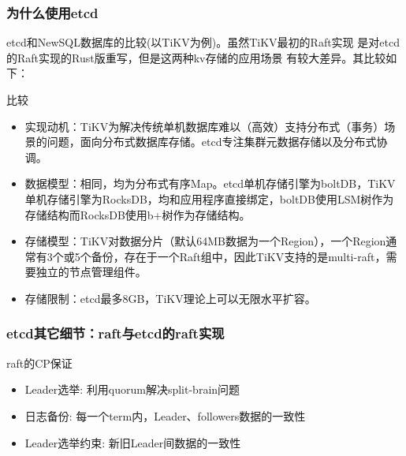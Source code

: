 \documentclass{beamer}
\begin{document}
%
%
\begin{frame}
\frametitle{为什么使用etcd}

etcd和NewSQL数据库的比较(以TiKV为例)。虽然TiKV最初的Raft实现
是对etcd的Raft实现的Rust版重写，但是这两种kv存储的应用场景
有较大差异。其比较如下：

\begin{alertblock}{比较}
    \begin{itemize}
        \item 实现动机：TiKV为解决传统单机数据库难以（高效）支持分布式（事务）场景的问题，面向分布式数据库存储。etcd专注集群元数据存储以及分布式协调。
        \item 数据模型：相同，均为分布式有序Map。etcd单机存储引擎为boltDB，TiKV单机存储引擎为RocksDB，均和应用程序直接绑定，boltDB使用LSM树作为存储结构而RocksDB使用b+树作为存储结构。
        \item 存储模型：TiKV对数据分片（默认64MB数据为一个Region），一个Region通常有3个或5个备份，存在于一个Raft组中，因此TiKV支持的是multi-raft，需要独立的节点管理组件。
        \item 存储限制：etcd最多8GB，TiKV理论上可以无限水平扩容。
    \end{itemize}
\end{alertblock}

\end{frame}

%
%
\begin{frame}
    \frametitle{etcd其它细节：raft与etcd的raft实现}
    
    \begin{block}{raft的CP保证}
    \begin{itemize}
        \item Leader选举: 利用quorum解决split-brain问题
        \item 日志备份: 每一个term内，Leader、followers数据的一致性
        \item Leader选举约束: 新旧Leader间数据的一致性
    \end{itemize}
    \end{block}
        
    
    \end{frame}
\end{document}
